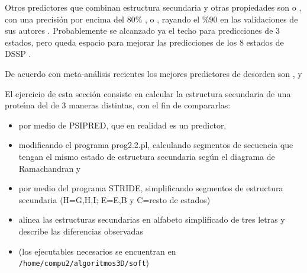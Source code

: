 
Otros predictores que combinan estructura secundaria y otras propiedades son 
 o 
, con una precisi\'{o}n por encima del 80\% \citep{Sormanni2014,Heffernan2015},
o , rayando el \%90 en las validaciones de sus autores \citep{Magnan2014}.
Probablemente se alcanzado ya el techo para predicciones de 3 estados, pero queda espacio para mejorar las predicciones 
de los 8 estados de DSSP \citep{Yang2018}. %

De acuerdo con meta-an\'{a}lisis recientes los mejores predictores de desorden son
,
 y
\citep{Wang2016,Meng2017}

El ejercicio de esta secci\'{o}n consiste en calcular la estructura secundaria de una prote\'\i{}na del 
 de 3 maneras distintas, con el fin de compararlas:
\begin{itemize}
\item por medio de PSIPRED, que en realidad es un predictor,
\item modificando el programa prog2.2.pl, calculando segmentos de secuencia que tengan el mismo estado de estructura secundaria
seg\'{u}n el diagrama de Ramachandran y 
\item por medio del programa STRIDE, simplificando segmentos de estructura secundaria (H=G,H,I; E=E,B y C=resto de estados)
\item alinea las estructuras secundarias en alfabeto simplificado de tres letras y describe las diferencias observadas
\item (los ejecutables necesarios se encuentran en \verb+/home/compu2/algoritmos3D/soft+)
\end{itemize}
